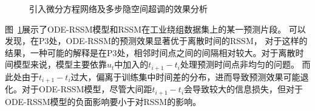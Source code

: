 \begin{figure}[ht]
%
%
\centering
\caption{引入微分方程网络及多步隐空间超调的效果分析}
\label{fig:5_predict_cmp}
\end{figure}
图~\ref{fig:5_predict_cmp}展示了ODE-RSSM模型和RSSM在工业绕组数据集上的某一预测片段。
可以发现，在P3处，ODE-RSSM的预测效果显著优于离散时间的RSSM，
对于这样的结果，一种可能的解释是在P3处，相邻时间点之间的间隔相对较大。对于离散时间模型来说，模型主要依靠$u_t$中加入的$t_{i+1}-t_i$处理预测时间点非均匀的问题。
而此处由于$t_{i+1}-t_i$过大，偏离于训练集中时间差的分布，进而导致预测效果可能退化。对于ODE-RSSM模型，尽管大间距$t_{i+1}-t_i$会导致较大的信息损失，但对于ODE-RSSM模型的负面影响要小于对RSSM的影响。

